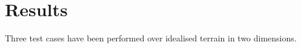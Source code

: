 \chapter{Results}
Three test cases have been performed over idealised terrain in two dimensions.  




